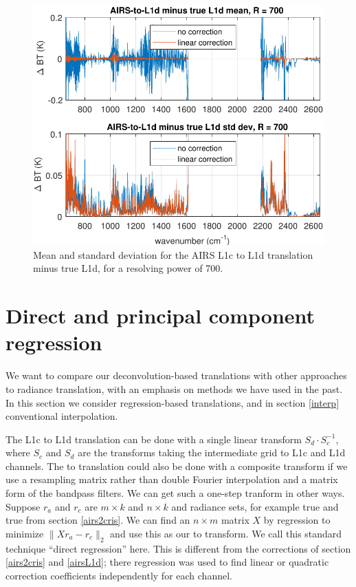 \documentclass[journal]{IEEEtran}
\begin{document}
\begin{figure} %
  \centering
  \includegraphics[width=\linewidth]{figures/L1d_cor1_700.pdf}
  \caption{Mean and standard deviation for the AIRS L1c to L1d
    translation minus true L1d, for a resolving power of 700.}
  \label{L1d700s}
\end{figure}

\section{Direct and principal component regression}
\label{dregr}

We want to compare our deconvolution-based translations with other
approaches to radiance translation, with an emphasis on methods we
have used in the past.  In this section we consider regression-based
translations, and in section \ref{interp} conventional
interpolation.

The {\airs} L1c to L1d translation can be done with a single 
linear transform $S_d\cdot S_c^{-1}$, where $S_c$ and $S_d$ are the
transforms taking the intermediate grid to L1c and L1d channels.
The {\airs} to {\cris} translation could also be done with a
composite transform if we use a resampling matrix rather than
double Fourier interpolation and a matrix form of the bandpass
filters.  We can get such a one-step tranform in other ways.
Suppose $r_a$ and $r_c$ are $m \times k$ and $n \times k$ {\airs}
and {\cris} radiance sets, for example true {\airs} and true {\cris}
from section \ref{airs2cris}.  We can find an $n \times m$ matrix
$X$ by regression to minimize $\|X r_a - r_c\|_2$ and use this as
our {\airs} to {\cris} transform.  We call this standard technique
``direct regression'' here.  This is different from the corrections
of section \ref{airs2cris} and \ref{airsL1d}; there regression was
used to find linear or quadratic correction coefficients
independently for each channel.
\end{document}
